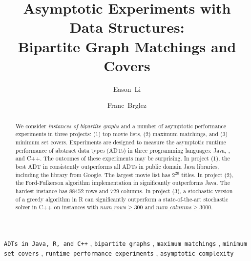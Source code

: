 \begin{frontmatter}

\title{
Asymptotic Experiments with Data Structures:\\ 
Bipartite Graph Matchings and Covers
}


\author{Eason~Li}
\author{Franc~Brglez}
\address{Computer Science, NC State University, Raleigh, NC 27695, USA}
%
%
\begin{abstract}
We consider {\em instances of bipartite  graphs}  and a number of asymptotic performance experiments in three projects: 
(1) top movie lists, %
(2) maximum matchings, and 
(3) minimum set covers.
Experiments are designed to measure the asymptotic runtime performance of abstract data types (ADTs) in three programming languages: Java, \R{}, and C++.
%
The outcomes of these experiments may be surprising.
%
In project (1), the best ADT in \R{} consistently outperforms all ADTs in public domain Java libraries, including the library from Google. 
The largest movie list has $2^{20}$ titles.
%
In project (2), the Ford-Fulkerson algorithm implementation in \R{} significantly outperforms Java.
The hardest instance has 88452 rows and 729 columns.
%
In project (3),  
a stochastic version of a greedy algorithm 
in R can significantly outperform a state-of-the-art stochastic
solver in C++ on instances with 
$num\_rows \ge 300$ and $num\_columns \ge 3000$. 
\end{abstract}
%
\begin{keyword}
\texttt{ADTs in Java, R, and C++}        \sep 
\texttt{bipartite graphs}                \sep 
\texttt{maximum matchings}               \sep 
\texttt{minimum set covers}              \sep 
\texttt{runtime performance experiments} \sep
\texttt{asymptotic complexity}   
\end{keyword}

\end{frontmatter}